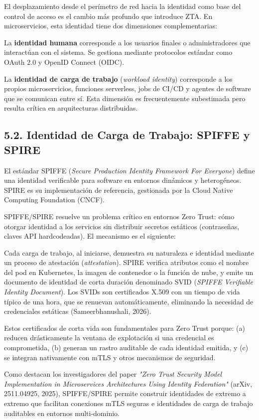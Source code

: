 \documentclass[12pt,a4paper]{article}
\begin{document}
El desplazamiento desde el perímetro de red hacia la identidad como base del control de acceso es el cambio más profundo que introduce ZTA. En microservicios, esta identidad tiene dos dimensiones complementarias:

La \textbf{identidad humana} corresponde a los usuarios finales o administradores que interactúan con el sistema. Se gestiona mediante protocolos estándar como OAuth 2.0 y OpenID Connect (OIDC).

La \textbf{identidad de carga de trabajo} (\textit{workload identity}) corresponde a los propios microservicios, funciones serverless, jobs de CI/CD y agentes de software que se comunican entre sí. Esta dimensión es frecuentemente subestimada pero resulta crítica en arquitecturas distribuidas.

\subsection{5.2. Identidad de Carga de Trabajo: SPIFFE y SPIRE}

El estándar SPIFFE (\textit{Secure Production Identity Framework For Everyone}) define una identidad verificable para software en entornos dinámicos y heterogéneos. SPIRE es su implementación de referencia, gestionada por la Cloud Native Computing Foundation (CNCF).

SPIFFE/SPIRE resuelve un problema crítico en entornos Zero Trust: cómo otorgar identidad a los servicios sin distribuir secretos estáticos (contraseñas, claves API hardcodeadas). El mecanismo es el siguiente:

Cada carga de trabajo, al iniciarse, demuestra su naturaleza e identidad mediante un proceso de atestación (\textit{attestation}). SPIRE verifica atributos como el nombre del pod en Kubernetes, la imagen de contenedor o la función de nube, y emite un documento de identidad de corta duración denominado SVID (\textit{SPIFFE Verifiable Identity Document}). Los SVIDs son certificados X.509 con un tiempo de vida típico de una hora, que se renuevan automáticamente, eliminando la necesidad de credenciales estáticas (Sameerbhanushali, 2026).

Estos certificados de corta vida son fundamentales para Zero Trust porque: (a) reducen drásticamente la ventana de explotación si una credencial es comprometida, (b) generan un rastro auditable de cada identidad emitida, y (c) se integran nativamente con mTLS y otros mecanismos de seguridad.

Como destacan los investigadores del paper \textit{"Zero Trust Security Model Implementation in Microservices Architectures Using Identity Federation"} (arXiv, 2511.04925, 2025), SPIFFE/SPIRE permite construir identidades de extremo a extremo que facilitan conexiones mTLS seguras e identidades de carga de trabajo auditables en entornos multi-dominio.
\end{document}

